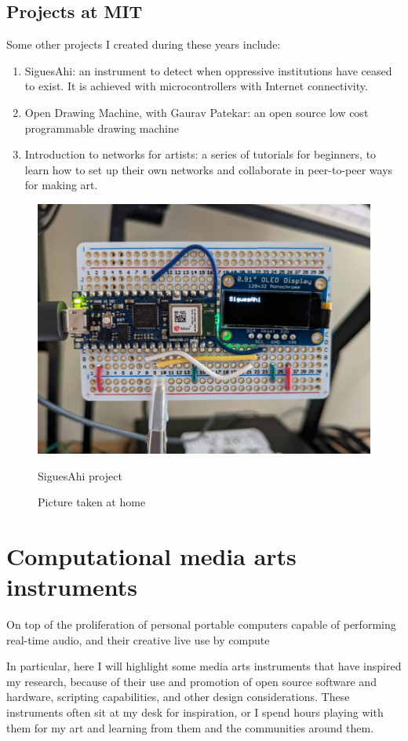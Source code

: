 \subsection{Projects at MIT}

Some other projects I created during these years include:

\begin{enumerate}
  \item SiguesAhi: an instrument to detect when oppressive institutions have ceased to exist. It is achieved with microcontrollers with Internet connectivity.
  \item Open Drawing Machine, with Gaurav Patekar: an open source low cost programmable drawing machine
  \item Introduction to networks for artists: a series of tutorials for beginners, to learn how to set up their own networks and collaborate in peer-to-peer ways for making art.
\end{enumerate}

\begin{figure}[ht]
  \centering
  \includegraphics[width=0.75\linewidth,height=0.25\textheight,keepaspectratio]{images/sigues-ahi.jpg}
  \caption{SiguesAhi project}
  \caption*{Picture taken at home}
  \label{fig:sigues-ahi}
\end{figure}

\section{Computational media arts instruments}

On top of the proliferation of personal portable computers capable of performing real-time audio, and their creative live use by compute

In particular, here I will highlight some media arts instruments that have inspired my research, because of their use and promotion of open source software and hardware, scripting capabilities, and other design considerations. These instruments often sit at my desk for inspiration, or I spend hours playing with them for my art and learning from them and the communities around them.


